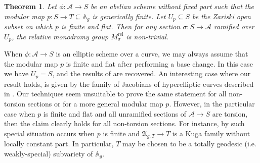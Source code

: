 \documentclass[10 pt,a4paper]{article}
\theoremstyle{plain}
\newtheorem{thm}{Theorem}[section]
\theoremstyle{definition}
\theoremstyle{named}
\newcommand{\bA}{\mathbb A}
\newcommand{\cA}{\mathcal A}
\begin{document}


\begin{thm}\label{mainThm1}
    Let $\phi:\mathcal A \to S$ be an abelian scheme without fixed part such that the modular map $p:S \to T \subseteq \mathbb A_g$ is generically  finite. Let $U_p\subseteq S$ be the Zariski open subset on which $p$ is finite and flat. Then for any section $\sigma\colon S\to \mathcal A$  ramified over $U_p$, the relative monodromy group $M_\sigma^{\textrm{rel}}$ is non-trivial.
\end{thm}
When $\phi\colon\mathcal{A} \to S$ is an elliptic scheme over a curve, we may always assume that the modular map $p$ is finite and flat after performing a base change. In this case we have $U_p = S$, and the results of \cite{CZ} are recovered. An interesting case where our result holds, is given by the family of Jacobians of hyperelliptic curves described in \cite[Section 8.1]{ACZ}. Our techniques seem unsuitable to prove the same statement for all non-torsion sections or for a more general modular map $p$. However, in the particular case  when $p$ is finite and flat and all unramified sections of $\mathcal A\to S$ are torsion, then the claim  clearly holds for all non-torsion sections. For instance, by \cite[Main Theorem]{MokTo} such special situation occurs  when $p$ is finite and $\mathfrak A_{g,T}\to T$ is a Kuga family without locally constant  part. In particular, $T$ may be chosen to be a totally geodesic (i.e. weakly-special) subvariety of $\bA_g$. 
\end{document}
